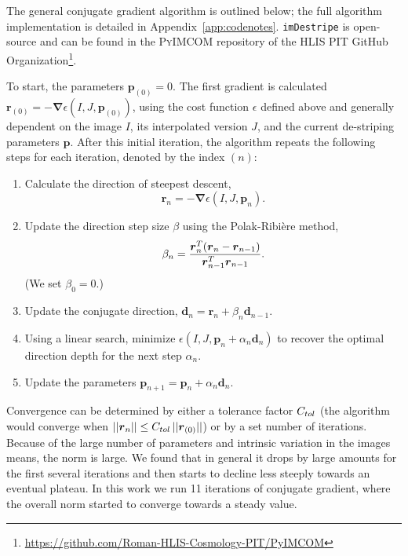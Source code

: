 \documentclass[]{pasj01}
\begin{document}
The general conjugate gradient algorithm is outlined below; the full algorithm implementation is detailed in Appendix~\ref{app:codenotes}. \texttt{imDestripe} is open-source and can be found in the \textsc{PyIMCOM} repository of the HLIS PIT GitHub Organization\footnote{\href{https://github.com/Roman-HLIS-Cosmology-PIT/PyIMCOM}{https://github.com/Roman-HLIS-Cosmology-PIT/PyIMCOM}}.

To start, the parameters ${\boldsymbol p}_{(0)}=0$. The first gradient is calculated ${\boldsymbol r}_{(0)}=-{\boldsymbol \nabla}\epsilon(I, J, {\boldsymbol p}_{(0)})$, using the cost function $\epsilon$ defined above and generally dependent on the image $I$, its interpolated version $J$, and the current de-striping parameters ${\boldsymbol p}$. After this initial iteration, the algorithm repeats the following steps for each iteration, denoted by the index $(n)$:
\begin{enumerate}
    \item Calculate the direction of steepest descent, 
    \begin{equation}
    {\boldsymbol r}_n = -{\boldsymbol \nabla}\epsilon(I, J, {\boldsymbol p}_n).
    \end{equation}
    \item Update the direction step size $\beta$ using the Polak-Ribi\`ere method,
    \begin{equation}
        \beta_{n} = \frac{{\boldsymbol r}_{n}^{\rm T}({\boldsymbol r}_{n}-{\boldsymbol r}_{n-1})}{{\boldsymbol r}^{\rm T}_{n-1} {\boldsymbol r}_{n-1}}.
    \end{equation}
    (We set $\beta_0=0$.)
    \item Update the conjugate direction, ${\boldsymbol d}_n = {\boldsymbol r}_n + \beta_n {\boldsymbol d}_{n-1}$.
    \item Using a linear search, minimize $\epsilon(I, J,{\boldsymbol p}_n + \alpha_n{\boldsymbol d}_n)$ to recover the optimal direction depth for the next step $\alpha_n$. 
    \item Update the parameters ${\boldsymbol p}_{n+1} = {\boldsymbol p}_n + \alpha_n{\boldsymbol d}_n$.
\end{enumerate}

Convergence can be determined by either a tolerance factor $C_{\rm tol}$ (the algorithm would converge when $||{\boldsymbol r}_n|| \leq C_{\rm tol}\,||{\boldsymbol r}_{(0)}||$) or by a set number of iterations. Because of the large number of parameters and intrinsic variation in the images means, the norm is large. We found that in general it drops by large amounts for the first several iterations and then starts to decline less steeply towards an eventual plateau. In this work we run 11 iterations of conjugate gradient, where the overall norm started to converge towards a steady value. 
\end{document}
